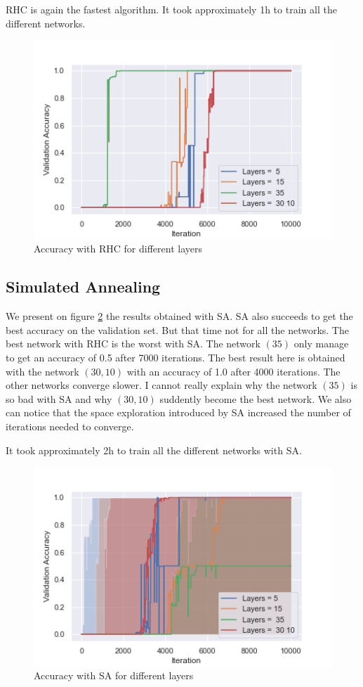 \documentclass[twocolumn, 10pt]{article}
\begin{document}
			RHC is again the fastest algorithm. It took approximately 1h to train all the different networks.

			\begin{figure}[h]
				\centering
				\includegraphics[width=0.68\linewidth]{../graphics/g_RHC_Iteration_Test_Error_Layers.png}
				\caption{Accuracy with RHC for different layers}
				\label{g:rhc}
			\end{figure}
		\subsection{Simulated Annealing}
			We present on figure \ref{g:sa} the results obtained with SA. SA also succeeds to get the best accuracy on the validation set. But that time not for all the networks. The best network with RHC is the worst with SA. The network $(35)$ only manage to get an accuracy of 0.5 after 7000 iterations. The best result here is obtained with the network $(30, 10)$ with an accuracy of 1.0 after 4000 iterations. The other networks converge slower. I cannot really explain why the network $(35)$ is so bad with SA and why $(30, 10)$ suddently become the best network. We also can notice that the space exploration introduced by SA increased the number of iterations needed to converge.

			It took approximately 2h to train all the different networks with SA.

			\begin{figure}[h]
				\centering
				\includegraphics[width=0.68\linewidth]{../graphics/g_SA_Iteration_Test_Error_Layers.png}
				\caption{Accuracy with SA for different layers}
				\label{g:sa}
			\end{figure}
\end{document}
